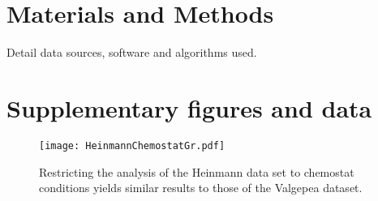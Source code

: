 \documentclass[notitlepage]{article}
\begin{document}
\section{Materials and Methods}
Detail data sources, software and algorithms used.

\section{Supplementary figures and data}
\begin{figure}[h]
\centering
\texttt{[image: HeinmannChemostatGr.pdf]}
\caption{
  Restricting the analysis of the Heinmann data set to chemostat conditions yields similar results to those of the Valgepea dataset.
}
\label{fig:growthcorrchemo}
\end{figure}

\begin{comment}
\begin{figure}[h]
\centering
\texttt{[image: CoordinatedRSquareComparison.pdf]}
\caption{
  Proteins in the global cluster fit reasonably well to the global cluster itself
}
\label{fig:globalfit}
\end{figure}

\begin{figure}[h]
\centering
\texttt{[image: GlobalClusterCorr.pdf]}
\caption{
Proteins that have a high correlation (0.4-0.8) with growth rate mostly have even higher correlation to the sum of these proteins (both weighted sum and normalized sum are presented).
Weighted sum means the concentrations of all proteins in the group are summed.
Normalized sum means every protein is first normalized to have an average concentration of 1 across the different growth conditions, and then all proteins in the group are summed.
The higher correlation indicates that their response is coordinated (they scale by the same factor between conditions).
}
\label{globalcorr}
\end{figure}

\begin{figure}[h]
\centering
\texttt{[image: GlobalClusterRSquare.pdf]}
\caption{
Plotting the $r^2$ distribution shows that a large fraction of the variability of these proteins is captured by the global response.
}
\label{globalrsq}
\end{figure}

\begin{itemize}
\item This happens in multiple organisms and data sets (show yeast, two data sets of coli). Possibly add mRNA measurements ??.
\end{itemize}
\end{comment}
\printbibliography
\end{document}
